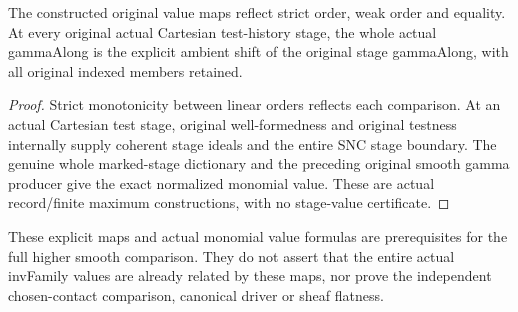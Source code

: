 \begin{corollary}
\label{hir:smooth-actual-value-original-stage-normalization}
\leanok
{}
The constructed original value maps reflect strict order, weak order and
equality. At every original actual Cartesian test-history stage, the whole
actual gammaAlong is the explicit ambient shift of the original stage
gammaAlong, with all original indexed members retained.
\end{corollary}
\begin{proof}
Strict monotonicity between linear orders reflects each comparison. At an
actual Cartesian test stage, original well-formedness and original testness
internally supply coherent stage ideals and the entire SNC stage boundary.
The genuine whole marked-stage dictionary and the preceding original smooth
gamma producer give the exact normalized monomial value. These are actual
record/finite maximum constructions, with no stage-value certificate.
\end{proof}

These explicit maps and actual monomial value formulas are prerequisites
for the full higher smooth comparison. They do not assert that the entire
actual invFamily values are already related by these maps, nor prove the
independent chosen-contact comparison, canonical driver or sheaf flatness.
